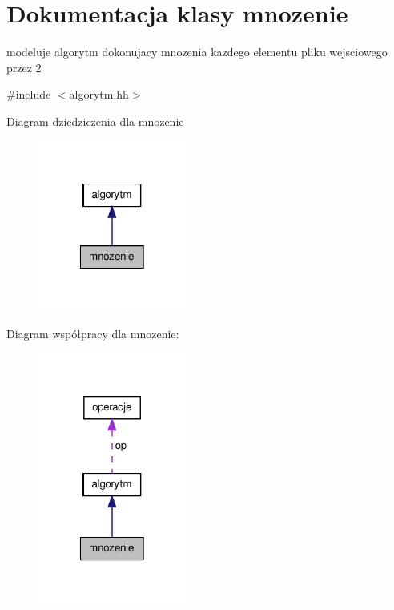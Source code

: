 \hypertarget{classmnozenie}{\section{\-Dokumentacja klasy mnozenie}
\label{classmnozenie}
}


modeluje algorytm dokonujacy mnozenia kazdego elementu pliku wejsciowego przez 2  




{\ttfamily \#include $<$algorytm.\-hh$>$}



\-Diagram dziedziczenia dla mnozenie
\nopagebreak
\begin{figure}[H]
\begin{center}
\leavevmode
\includegraphics[width=138pt]{classmnozenie__inherit__graph}
\end{center}
\end{figure}


\-Diagram współpracy dla mnozenie\-:
\nopagebreak
\begin{figure}[H]
\begin{center}
\leavevmode
\includegraphics[width=138pt]{classmnozenie__coll__graph}
\end{center}
\end{figure}
